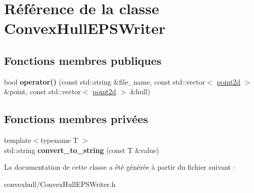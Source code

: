 \hypertarget{class_convex_hull_e_p_s_writer}{\section{Référence de la classe Convex\-Hull\-E\-P\-S\-Writer}
\label{class_convex_hull_e_p_s_writer}
}
\subsection*{Fonctions membres publiques}
\begin{DoxyCompactItemize}
\item 
\hypertarget{class_convex_hull_e_p_s_writer_a6d53dbdc0a4ff86fdb712b280b32e8b9}{bool {\bfseries operator()} (const std\-::string \&file\-\_\-name, const std\-::vector$<$ \hyperlink{structpoint2d}{point2d} $>$ \&point, const std\-::vector$<$ \hyperlink{structpoint2d}{point2d} $>$ \&hull)}\label{class_convex_hull_e_p_s_writer_a6d53dbdc0a4ff86fdb712b280b32e8b9}

\end{DoxyCompactItemize}
\subsection*{Fonctions membres privées}
\begin{DoxyCompactItemize}
\item 
\hypertarget{class_convex_hull_e_p_s_writer_a3b137bf654d760d8da0eefaf465f1b7a}{{\footnotesize template$<$typename T $>$ }\\std\-::string {\bfseries convert\-\_\-to\-\_\-string} (const T \&value)}\label{class_convex_hull_e_p_s_writer_a3b137bf654d760d8da0eefaf465f1b7a}

\end{DoxyCompactItemize}


La documentation de cette classe a été générée à partir du fichier suivant \-:\begin{DoxyCompactItemize}
\item 
convexhull/Convex\-Hull\-E\-P\-S\-Writer.\-h\end{DoxyCompactItemize}
